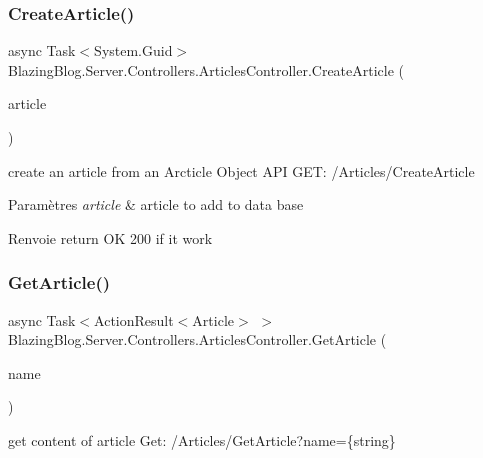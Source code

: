 \subsubsection{\texorpdfstring{Create\+Article()}{CreateArticle()}}
{\footnotesize\ttfamily async Task$<$System.\+Guid$>$ Blazing\+Blog.\+Server.\+Controllers.\+Articles\+Controller.\+Create\+Article (\begin{DoxyParamCaption}\item[{\mbox{[}\+From\+Body\mbox{]} Article}]{article }\end{DoxyParamCaption})\hspace{0.3cm}{\ttfamily [inline]}}



create an article from an Arcticle Object A\+PI G\+ET\+: /\+Articles/\+Create\+Article 


\begin{DoxyParams}{Paramètres}
{\em article} & article to add to data base\\
\hline
\end{DoxyParams}
\begin{DoxyReturn}{Renvoie}
return OK 200 if it work
\end{DoxyReturn}
\mbox{\label{class_blazing_blog_1_1_server_1_1_controllers_1_1_articles_controller_a69e1b42a4f3198d4737296e661f95a75}} 
\subsubsection{\texorpdfstring{Get\+Article()}{GetArticle()}}
{\footnotesize\ttfamily async Task$<$Action\+Result$<$Article$>$ $>$ Blazing\+Blog.\+Server.\+Controllers.\+Articles\+Controller.\+Get\+Article (\begin{DoxyParamCaption}\item[{\mbox{[}\+From\+Query\mbox{]} string}]{name }\end{DoxyParamCaption})\hspace{0.3cm}{\ttfamily [inline]}}



get content of article Get\+: /\+Articles/\+Get\+Article?name=\{string\} 


